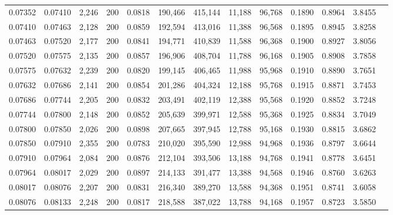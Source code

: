 \begin{tabular}{rrrrrrrrrrrrr}
0.07352 & 0.07410 & 2,246 & 200 &                                     0.0818 & 190,466 & 415,144 &  11,188 &  96,768 & 0.1890 & 0.8964 & 3.8455 \\
0.07410 & 0.07463 & 2,128 & 200 &                                     0.0859 & 192,594 & 413,016 &  11,388 &  96,568 & 0.1895 & 0.8945 & 3.8258 \\
0.07463 & 0.07520 & 2,177 & 200 &                                     0.0841 & 194,771 & 410,839 &  11,588 &  96,368 & 0.1900 & 0.8927 & 3.8056 \\
0.07520 & 0.07575 & 2,135 & 200 &                                     0.0857 & 196,906 & 408,704 &  11,788 &  96,168 & 0.1905 & 0.8908 & 3.7858 \\
0.07575 & 0.07632 & 2,239 & 200 &                                     0.0820 & 199,145 & 406,465 &  11,988 &  95,968 & 0.1910 & 0.8890 & 3.7651 \\
0.07632 & 0.07686 & 2,141 & 200 &                                     0.0854 & 201,286 & 404,324 &  12,188 &  95,768 & 0.1915 & 0.8871 & 3.7453 \\
0.07686 & 0.07744 & 2,205 & 200 &                                     0.0832 & 203,491 & 402,119 &  12,388 &  95,568 & 0.1920 & 0.8852 & 3.7248 \\
0.07744 & 0.07800 & 2,148 & 200 &                                     0.0852 & 205,639 & 399,971 &  12,588 &  95,368 & 0.1925 & 0.8834 & 3.7049 \\
0.07800 & 0.07850 & 2,026 & 200 &                                     0.0898 & 207,665 & 397,945 &  12,788 &  95,168 & 0.1930 & 0.8815 & 3.6862 \\
0.07850 & 0.07910 & 2,355 & 200 &                                     0.0783 & 210,020 & 395,590 &  12,988 &  94,968 & 0.1936 & 0.8797 & 3.6644 \\
0.07910 & 0.07964 & 2,084 & 200 &                                     0.0876 & 212,104 & 393,506 &  13,188 &  94,768 & 0.1941 & 0.8778 & 3.6451 \\
0.07964 & 0.08017 & 2,029 & 200 &                                     0.0897 & 214,133 & 391,477 &  13,388 &  94,568 & 0.1946 & 0.8760 & 3.6263 \\
0.08017 & 0.08076 & 2,207 & 200 &                                     0.0831 & 216,340 & 389,270 &  13,588 &  94,368 & 0.1951 & 0.8741 & 3.6058 \\
0.08076 & 0.08133 & 2,248 & 200 &                                     0.0817 & 218,588 & 387,022 &  13,788 &  94,168 & 0.1957 & 0.8723 & 3.5850 \\

\end{tabular}
